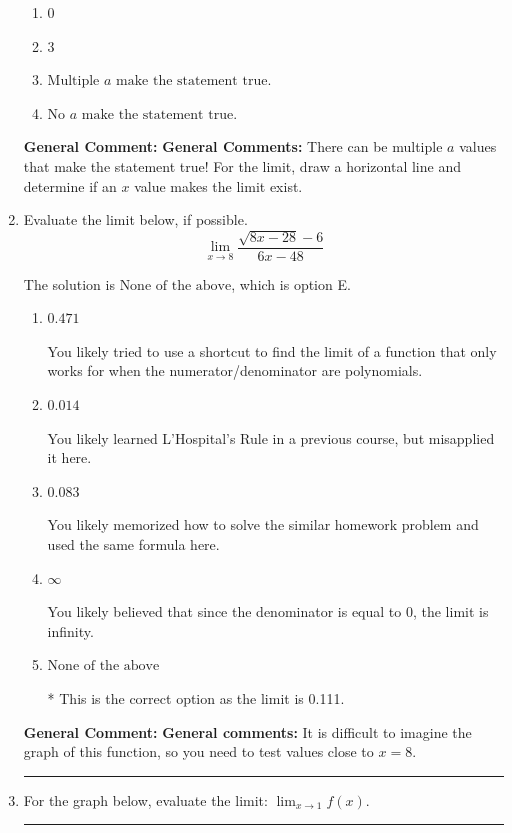 \documentclass{extbook}[14pt]
\newcommand{\litem}[1]{\item #1

\rule{\textwidth}{0.4pt}}
\begin{document}
\begin{enumerate}
{\begin{enumerate}[label=\Alph*.]
\item \( 0 \)


\item \( 3 \)


\item \( \text{Multiple } a \text{ make the statement true}. \)


\item \( \text{No } a \text{ make the statement true}. \)


\end{enumerate}

\textbf{General Comment:} \textbf{General Comments:} There can be multiple $a$ values that make the statement true! For the limit, draw a horizontal line and determine if an $x$ value makes the limit exist.
}
\litem{
Evaluate the limit below, if possible.
\[ \lim_{x \rightarrow 8} \frac{\sqrt{8x - 28} - 6}{6x - 48} \]

The solution is \( \text{None of the above} \), which is option E.\begin{enumerate}[label=\Alph*.]
\item \( 0.471 \)

You likely tried to use a shortcut to find the limit of a function that only works for when the numerator/denominator are polynomials.
\item \( 0.014 \)

You likely learned L'Hospital's Rule in a previous course, but misapplied it here.
\item \( 0.083 \)

You likely memorized how to solve the similar homework problem and used the same formula here.
\item \( \infty \)

You likely believed that since the denominator is equal to 0, the limit is infinity.
\item \( \text{None of the above} \)

* This is the correct option as the limit is 0.111.
\end{enumerate}

\textbf{General Comment:} \textbf{General comments:} It is difficult to imagine the graph of this function, so you need to test values close to $x = 8$.
}
\litem{
For the graph below, evaluate the limit: $ \displaystyle \lim_{x \rightarrow 1} f(x)$.

}
\end{enumerate}
\end{document}
